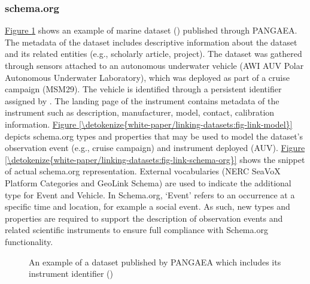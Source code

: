 \documentclass[a4paper,10pt,english]{sphinxmanual}
\begin{document}
\subsubsection{schema.org}
\label{\detokenize{white-paper/linking-datasets:schema-org}}
\hyperref[\detokenize{white-paper/linking-datasets:fig-link-pangea}]{Figure \ref{\detokenize{white-paper/linking-datasets:fig-link-pangea}}} shows an example of marine dataset
() published through PANGAEA. The
metadata of the dataset includes descriptive information about the
dataset and its related entities (e.g., scholarly article, project). The
dataset was gathered through sensors attached to an autonomous
underwater vehicle (AWI AUV Polar Autonomous Underwater Laboratory),
which was deployed as part of a cruise campaign (MSM29). The vehicle is
identified through a persistent identifier assigned by
. The landing page of the instrument contains
metadata of the instrument such as description, manufacturer, model,
contact, calibration information. \hyperref[\detokenize{white-paper/linking-datasets:fig-link-model}]{Figure \ref{\detokenize{white-paper/linking-datasets:fig-link-model}}} depicts
schema.org types and properties that may be used to model the
dataset’s observation event (e.g., cruise campaign) and instrument
deployed (AUV). \hyperref[\detokenize{white-paper/linking-datasets:fig-link-schema-org}]{Figure \ref{\detokenize{white-paper/linking-datasets:fig-link-schema-org}}} shows the snippet of
actual schema.org representation. External vocabularies (NERC SeaVoX
Platform Categories and GeoLink Schema) are used to indicate the
additional type for Event and Vehicle. In Schema.org, ‘Event’ refers
to an occurrence at a specific time and location, for example a social
event. As such, new types and properties are required to support the
description of observation events and related scientific instruments
to ensure full compliance with Schema.org functionality.

\begin{figure}[htbp]
\centering
\capstart

\noindent{}
\caption{An example of a dataset published by PANGAEA which includes its
instrument identifier
()}\label{\detokenize{white-paper/linking-datasets:id6}}\label{\detokenize{white-paper/linking-datasets:fig-link-pangea}}\end{figure}
\end{document}
